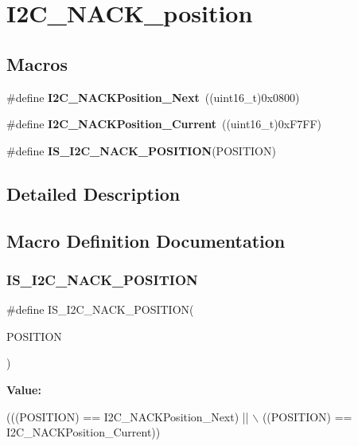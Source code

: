 \hypertarget{group___i2_c___n_a_c_k__position}{}\section{I2\+C\+\_\+\+N\+A\+C\+K\+\_\+position}
\label{group___i2_c___n_a_c_k__position}
\subsection*{Macros}
\begin{DoxyCompactItemize}
\item 
\mbox{\label{group___i2_c___n_a_c_k__position_gacb512a4bd4841a763b6ec51606687fca}} 
\#define {\bfseries I2\+C\+\_\+\+N\+A\+C\+K\+Position\+\_\+\+Next}~((uint16\+\_\+t)0x0800)
\item 
\mbox{\label{group___i2_c___n_a_c_k__position_ga8d91c1e62730a9d927ca8e9ec4f7ef8f}} 
\#define {\bfseries I2\+C\+\_\+\+N\+A\+C\+K\+Position\+\_\+\+Current}~((uint16\+\_\+t)0x\+F7\+F\+F)
\item 
\#define {\bfseries I\+S\+\_\+\+I2\+C\+\_\+\+N\+A\+C\+K\+\_\+\+P\+O\+S\+I\+T\+I\+ON}(P\+O\+S\+I\+T\+I\+ON)
\end{DoxyCompactItemize}


\subsection{Detailed Description}


\subsection{Macro Definition Documentation}
\mbox{\label{group___i2_c___n_a_c_k__position_ga631b4b1674a12aa2b3b27360983029e3}} 
\subsubsection{\texorpdfstring{I\+S\+\_\+\+I2\+C\+\_\+\+N\+A\+C\+K\+\_\+\+P\+O\+S\+I\+T\+I\+ON}{IS\_I2C\_NACK\_POSITION}}
{\footnotesize\ttfamily \#define I\+S\+\_\+\+I2\+C\+\_\+\+N\+A\+C\+K\+\_\+\+P\+O\+S\+I\+T\+I\+ON(\begin{DoxyParamCaption}\item[{}]{P\+O\+S\+I\+T\+I\+ON }\end{DoxyParamCaption})}

{\bfseries Value\+:}
\begin{DoxyCode}
(((POSITION) == I2C\_NACKPosition\_Next) || \(\backslash\)
                                         ((POSITION) == I2C\_NACKPosition\_Current))
\end{DoxyCode}
